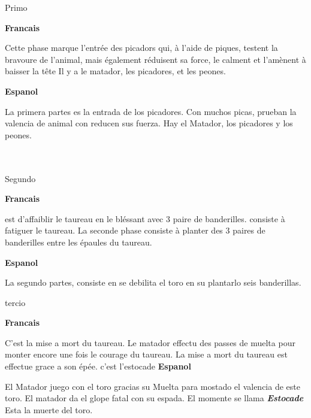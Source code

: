 \documentclass[12pt,a4paper]{article}
\begin{document}
\begin{dev}
	\color{blue}	
		\item Primo \par
	\color{red}	
\textbf{	Francais} \par

Cette phase marque l'entrée des picadors qui, à l'aide de piques, testent la bravoure de l'animal, mais également réduisent sa force, le calment et l'amènent à baisser la tête
		Il y a le matador, les picadores, et les peones.\par
	\color{black}	
\textbf{Espanol} \par
		La primera partes es la entrada de los picadores. 
		Con muchos picas, prueban la valencia de animal con reducen sus fuerza. 
		Hay el Matador, los picadores y los peones.\\\\\\


	\color{blue}	
		\item Segundo \par
	\color{red}	
\textbf{	Francais} \par
		est d'affaiblir le taureau en le bl\'essant avec 3 paire de banderilles.
		consiste à fatiguer le taureau.
		La seconde phase consiste à planter des 3 paires de banderilles entre les épaules du taureau.\par
	\color{black}	
\textbf{Espanol} \par
		La segundo partes, consiste en se debilita el toro en su plantarlo seis banderillas.
		 



	\color{blue}	
		\item tercio \par
	\color{red}	
\textbf{	Francais} \par
	C'est la mise a mort du taureau.
	Le matador effectu des passes de muelta pour monter encore une fois le courage du taureau.
	La mise a mort du taureau est effectue grace a son épée. c'est l'estocade 
	\color{black}	
\textbf{Espanol} \par
	El Matador juego con el toro gracias su Muelta para mostado el valencia de este toro.
	El matador da el glope fatal con su espada. 
	El momente se llama \textbf{\textit{Estocade}}
	Esta la muerte del toro.
	

		\end{dev}
\end{document}
